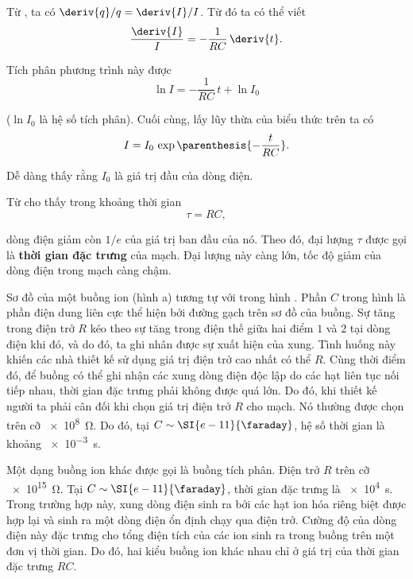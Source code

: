 \noindent
Từ , ta có $\deriv{q}/q=\deriv{I}/I$.
Từ đó ta có thể viết 
\begin{equation*}
    \frac{\deriv{I}}{I} = - \frac{1}{RC}\, \deriv{t}.
\end{equation*}

\noindent
Tích phân phương trình này được
\begin{equation*}
    \ln{I} = - \frac{1}{RC}\, t + \ln{I_0}
\end{equation*}

\noindent
($\ln{I_0}$ là hệ số tích phân).
Cuối cùng, lấy lũy thừa của biểu thức trên ta có
\begin{equation}\label{eq:12_10}
    I = I_0\, \exp\parenthesis{- \frac{t}{RC}}.
\end{equation}

\noindent
Dễ dàng thấy rằng $I_0$ là giá trị đầu của dòng điện.

Từ  cho thấy trong khoảng thời gian
\begin{equation}\label{eq:12_11}
    \tau = RC,
\end{equation}

\noindent
dòng điện giảm còn $1/e$ của giá trị ban đầu của nó.
Theo đó, đại lượng $\tau$ được gọi là \textbf{thời gian đặc trưng} của mạch.
Đại lượng này càng lớn, tốc độ giảm của dòng điện trong mạch càng chậm.

Sơ đồ của một buồng ion (hình a) tương tự với trong hình .
Phần $C$ trong hình là phần điện dung liên cực thể hiện bởi đường gạch trên sơ đồ của buồng. 
Sự tăng trong điện trở $R$ kéo theo sự tăng trong điện thế giữa hai điểm $1$ và $2$ tại dòng điện khi đó, và do đó, ta ghi nhân được sự xuất hiện của xung.
Tình huống này khiến các nhà thiết kế sử dụng giá trị điện trở cao nhất có thể $R$.
Cùng thời điểm đó, để buồng có thể ghi nhận các xung dòng điện độc lập do các hạt liên tục nối tiếp nhau, thời gian đặc trưng phải không được quá lớn. 
Do đó, khi thiết kế người ta phải cân đối khi chọn giá trị điện trở $R$ cho mạch.
Nó thường được chọn trên cỡ \SI{e8}{\ohm}.
Do đó, tại $C\sim\SI{e-11}{\faraday}$, hệ số thời gian là khoảng \SI{e-3}{\second}.

Một dạng buồng ion khác được gọi là buồng tích phân.
Điện trở $R$ trên cỡ \SI{e15}{\ohm}.
Tại $C\sim\SI{e-11}{\faraday}$, thời gian đặc trưng là \SI{e4}{\second}.
Trong trường hợp này, xung dòng điện sinh ra bởi các hạt ion hóa riêng biệt được hợp lại và sinh ra một 
dòng điện ổn định chạy qua điện trở.
Cường độ của dòng điện này đặc trưng cho tổng điện tích của các ion sinh ra trong buồng trên một đơn vị thời gian.
Do đó, hai kiểu buồng ion khác nhau chỉ ở giá trị của thời gian đặc trưng $RC$.

